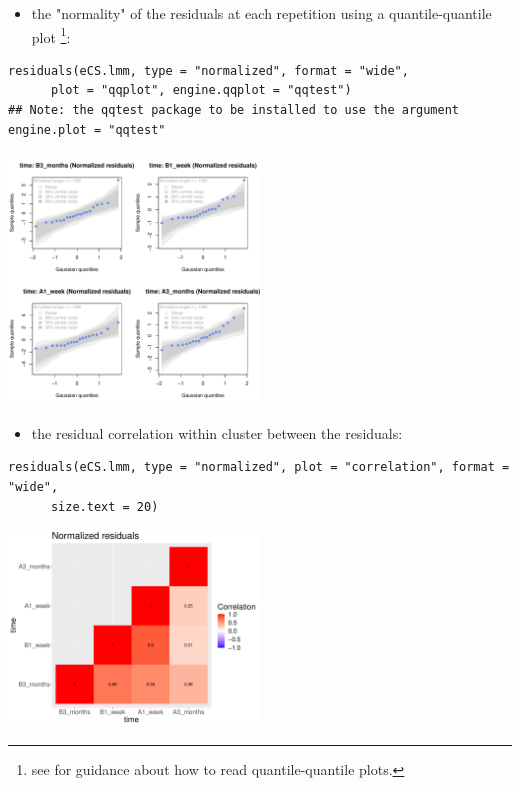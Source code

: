 \documentclass[12pt]{article}
\begin{document}
\clearpage

\begin{itemize}
\item the "normality" of the residuals at each repetition using a
quantile-quantile plot \footnote{see \cite{oldford2016self} for guidance
about how to read quantile-quantile plots.}:
\end{itemize}
\lstset{language=r,label= ,caption= ,captionpos=b,numbers=none}
\begin{lstlisting}
residuals(eCS.lmm, type = "normalized", format = "wide",
	  plot = "qqplot", engine.qqplot = "qqtest")
## Note: the qqtest package to be installed to use the argument engine.plot = "qqtest" 
\end{lstlisting}

\begin{center}
\includegraphics[width=0.5\textwidth]{./figures/diag-qqplot.pdf}
\end{center}

\begin{itemize}
\item the residual correlation within cluster between the residuals:
\end{itemize}
\lstset{language=r,label= ,caption= ,captionpos=b,numbers=none}
\begin{lstlisting}
residuals(eCS.lmm, type = "normalized", plot = "correlation", format = "wide",
	  size.text = 20)
\end{lstlisting}

\begin{center}
\includegraphics[width=0.5\textwidth]{./figures/diag-correlation.pdf}
\end{center}
\end{document}
